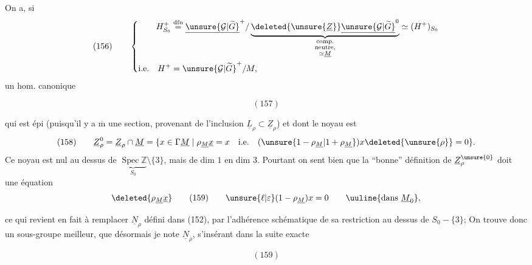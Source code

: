 On a, si
\[
(156)\qquad\left\{
\begin{aligned}
H^+_{S_0}&\overset{\mathrm{dfn}}{=}
\underline{\unsure{\mathcal G|\widetilde G}}^{+}/
\underbrace{\deleted{\unsure{\underline Z}}\underline{\unsure{\mathcal G|\widetilde G}}^{0}}_{\substack{\text{comp.}\\\text{neutre,}\\\simeq\underline M}}
\simeq(H^+)_{S_0}\\
\text{i.e.}\quad H^+&=\unsure{\mathcal G|\widetilde G}^{+}/M,
\end{aligned}\right.
\]
un hom. canonique
\begin{samepage}
\[
(157)
\]
\end{samepage}
qui est épi (puisqu'il y a $\overline{\mathrm m}$ une section, provenant de l'inclusion $\underline L_\rho\subset\underline Z_\rho$) et dont le noyau est
\[
(158)\qquad
\underline Z_\rho^0=\underline Z_\rho\cap\underline M
=\{x\in\Gamma\underline M\mid\rho_{\underline M}\underline x=x\quad\text{i.e.}\quad(\unsure{1-\rho_{\underline M}|1+\rho_{\underline M}})x\deleted{\unsure{\rho}}=0\}.
\]
Ce noyau est nul au dessus de $\underbrace{\operatorname{Spec}\mathbb Z}_{S_0}\setminus\{3\}$,
mais de dim $1$ en dim $3$. Pourtant on sent bien que la ``bonne'' définition de $\underline Z_\rho^{\unsure{0}}$  doit  une équation
\[
\deleted{\rho_{\underline M}\underline x}\qquad
(159)\qquad \unsure{\ell|\varepsilon}(1-\rho_{\underline M})x=0\qquad\uuline{\text{dans }\underline M_0},
\]


ce qui revient en fait  à remplacer $\underline N_\rho$ défini dans (152), par l'adhérence schématique de sa restriction au dessus de $S_0-\{3\}$; On trouve donc un sous-groupe meilleur, que désormais je note $\underline N_\rho$, s'insérant dans la suite exacte
\begin{samepage}
\[
(159)
\]
\end{samepage}

